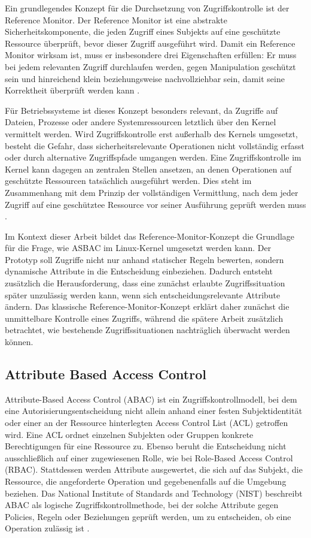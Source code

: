 Ein grundlegendes Konzept für die Durchsetzung von Zugriffskontrolle ist der Reference Monitor.
Der Reference Monitor ist eine abstrakte Sicherheitskomponente, die jeden Zugriff eines Subjekts auf eine geschützte Ressource überprüft, bevor dieser Zugriff ausgeführt wird.
Damit ein Reference Monitor wirksam ist, muss er insbesondere drei Eigenschaften erfüllen: Er muss bei jedem relevanten Zugriff durchlaufen werden, gegen Manipulation geschützt sein und hinreichend klein beziehungsweise nachvollziehbar sein, damit seine Korrektheit überprüft werden kann \citep[Abschnitt~3.4, S.~17]{anderson1972computer}.

Für Betriebssysteme ist dieses Konzept besonders relevant, da Zugriffe auf Dateien, Prozesse oder andere Systemressourcen letztlich über den Kernel vermittelt werden.
Wird Zugriffskontrolle erst außerhalb des Kernels umgesetzt, besteht die Gefahr, dass sicherheitsrelevante Operationen nicht vollständig erfasst oder durch alternative Zugriffspfade umgangen werden.
Eine Zugriffskontrolle im Kernel kann dagegen an zentralen Stellen ansetzen, an denen Operationen auf geschützte Ressourcen tatsächlich ausgeführt werden.
Dies steht im Zusammenhang mit dem Prinzip der vollständigen Vermittlung, nach dem jeder Zugriff auf eine geschütztee Ressource vor seiner Ausführung geprüft werden muss \citep{saltzer1975protection}.

Im Kontext dieser Arbeit bildet das Reference-Monitor-Konzept die Grundlage für die Frage, wie ASBAC im Linux-Kernel umgesetzt werden kann.
Der Prototyp soll Zugriffe nicht nur anhand statischer Regeln bewerten, sondern dynamische Attribute in die Entscheidung einbeziehen.
Dadurch entsteht zusätzlich die Herausforderung, dass eine zunächst erlaubte Zugriffssituation später unzulässig werden kann, wenn sich entscheidungsrelevante Attribute ändern.
Das klassische Reference-Monitor-Konzept erklärt daher zunächst die unmittelbare Kontrolle eines Zugriffs, während die spätere Arbeit zusätzlich betrachtet, wie bestehende Zugriffssituationen nachträglich überwacht werden können.

\subsection{Attribute Based Access Control}
Attribute-Based Access Control (ABAC) ist ein Zugriffskontrollmodell, bei dem eine Autorisierungsentscheidung nicht allein anhand einer festen Subjektidentität oder einer an der Ressource hinterlegten Access Control List (ACL) getroffen wird. Eine ACL ordnet einzelnen Subjekten oder Gruppen konkrete Berechtigungen für eine Ressource zu. Ebenso beruht die Entscheidung nicht ausschließlich auf einer zugewiesenen Rolle, wie bei Role-Based Access Control (RBAC).
Stattdessen werden Attribute ausgewertet, die sich auf das Subjekt, die Ressource, die angeforderte Operation und gegebenenfalls auf die Umgebung beziehen.
Das National Institute of Standards and Technology (NIST) beschreibt ABAC als logische Zugriffskontrollmethode, bei der solche Attribute gegen Policies, Regeln oder Beziehungen geprüft werden, um zu entscheiden, ob eine Operation zulässig ist \citep{nistSP800162}.

